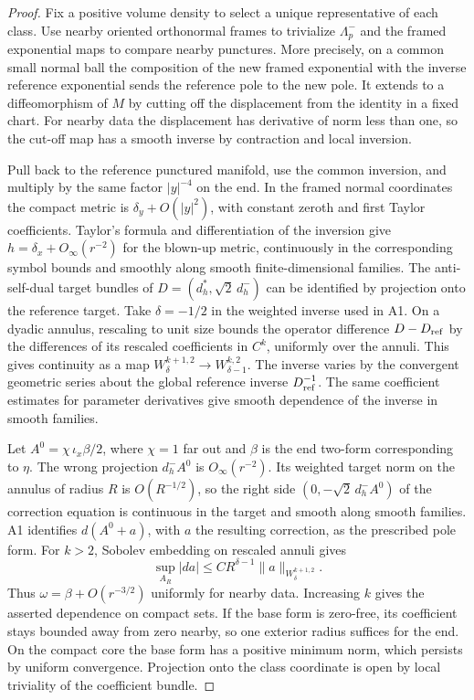 \documentclass[11pt,letterpaper]{article}
\numberwithin{equation}{section}
\begin{document}
\begin{proof}
Fix a positive volume density to select a unique representative of
each class. Use nearby oriented orthonormal frames to trivialize
\(\Lambda^-_p\) and the framed exponential maps to compare nearby
punctures. More precisely, on a common small normal ball the composition
of the new framed exponential with the inverse reference exponential
sends the reference pole to the new pole. It extends to a diffeomorphism
of \(M\) by cutting off the displacement from the identity in a fixed
chart. For nearby data the displacement has derivative of norm less than
one, so the cut-off map has a smooth inverse by contraction and local
inversion.

Pull back to the reference punctured manifold, use the common inversion,
and multiply by the same factor \(|y|^{-4}\) on the end. In the framed
normal coordinates the compact metric is \(\delta_y+O(|y|^2)\), with
constant zeroth and first Taylor coefficients. Taylor's formula and
differentiation of the inversion give \(h=\delta_x+O_\infty(r^{-2})\)
for the blown-up metric, continuously in the corresponding symbol
bounds and smoothly along smooth finite-dimensional families. The
anti-self-dual target bundles of \(D=(d_h^*,\sqrt2\,d_h^-)\) can be
identified by projection onto the reference target. Take
\(\delta=-1/2\) in the weighted inverse used in A1. On a dyadic
annulus, rescaling to unit size bounds the operator difference
\(D-D_{\rm ref}\) by the differences of its rescaled coefficients in
\(C^k\), uniformly over the annuli. This gives continuity as a map
\(W^{k+1,2}_\delta\to W^{k,2}_{\delta-1}\). The inverse varies by the
convergent geometric series about the global reference inverse \(D_{\rm ref}^{-1}\). The same coefficient
estimates for parameter derivatives give smooth dependence of the
inverse in smooth families.

Let \(A^0=\chi\,\iota_x\beta/2\), where \(\chi=1\) far out and
\(\beta\) is the end two-form corresponding to \(\eta\). The wrong
projection \(d_h^-A^0\) is \(O_\infty(r^{-2})\). Its weighted target
norm on the annulus of radius \(R\) is \(O(R^{-1/2})\), so the right
side \((0,-\sqrt2\,d_h^-A^0)\) of the correction equation is continuous
in the target and smooth along smooth families. A1 identifies \(d(A^0+a)\), with \(a\)
the resulting correction, as the prescribed pole form. For \(k>2\),
Sobolev embedding on rescaled annuli gives
\[
 \sup_{A_R}|da|\le C R^{\delta-1}\|a\|_{W^{k+1,2}_\delta}.
\]
Thus \(\omega=\beta+O(r^{-3/2})\) uniformly for nearby data. Increasing
\(k\) gives the asserted dependence on compact sets. If the base form
is zero-free, its coefficient stays bounded away from zero nearby,
so one exterior radius suffices for the end. On the compact core the
base form has a positive minimum norm, which persists by uniform
convergence. Projection onto the class coordinate is open by local
triviality of the coefficient bundle.
\end{proof}
\end{document}

